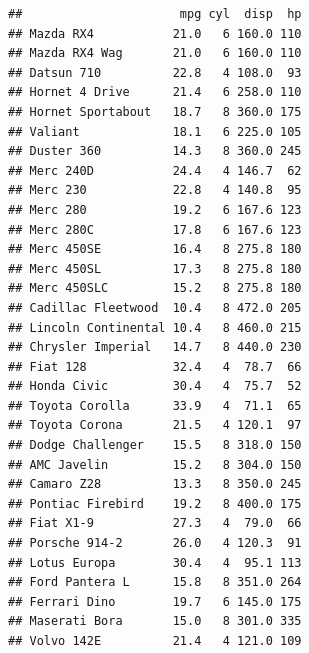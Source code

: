 \documentclass[]{report}
\newenvironment{Shaded}{\begin{snugshade}}{\end{snugshade}}
\newcommand{\KeywordTok}[1]{\textcolor[rgb]{0.13,0.29,0.53}{\textbf{#1}}}
\newcommand{\DecValTok}[1]{\textcolor[rgb]{0.00,0.00,0.81}{#1}}
\newcommand{\StringTok}[1]{\textcolor[rgb]{0.31,0.60,0.02}{#1}}
\newcommand{\OperatorTok}[1]{\textcolor[rgb]{0.81,0.36,0.00}{\textbf{#1}}}
\newcommand{\NormalTok}[1]{#1}
\begin{document}
\begin{Shaded}
\end{Shaded}

\begin{verbatim}
##                      mpg cyl  disp  hp
## Mazda RX4           21.0   6 160.0 110
## Mazda RX4 Wag       21.0   6 160.0 110
## Datsun 710          22.8   4 108.0  93
## Hornet 4 Drive      21.4   6 258.0 110
## Hornet Sportabout   18.7   8 360.0 175
## Valiant             18.1   6 225.0 105
## Duster 360          14.3   8 360.0 245
## Merc 240D           24.4   4 146.7  62
## Merc 230            22.8   4 140.8  95
## Merc 280            19.2   6 167.6 123
## Merc 280C           17.8   6 167.6 123
## Merc 450SE          16.4   8 275.8 180
## Merc 450SL          17.3   8 275.8 180
## Merc 450SLC         15.2   8 275.8 180
## Cadillac Fleetwood  10.4   8 472.0 205
## Lincoln Continental 10.4   8 460.0 215
## Chrysler Imperial   14.7   8 440.0 230
## Fiat 128            32.4   4  78.7  66
## Honda Civic         30.4   4  75.7  52
## Toyota Corolla      33.9   4  71.1  65
## Toyota Corona       21.5   4 120.1  97
## Dodge Challenger    15.5   8 318.0 150
## AMC Javelin         15.2   8 304.0 150
## Camaro Z28          13.3   8 350.0 245
## Pontiac Firebird    19.2   8 400.0 175
## Fiat X1-9           27.3   4  79.0  66
## Porsche 914-2       26.0   4 120.3  91
## Lotus Europa        30.4   4  95.1 113
## Ford Pantera L      15.8   8 351.0 264
## Ferrari Dino        19.7   6 145.0 175
## Maserati Bora       15.0   8 301.0 335
## Volvo 142E          21.4   4 121.0 109
\end{verbatim}

\begin{Shaded}
\end{Shaded}
\end{document}
